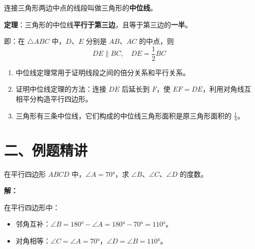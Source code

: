 \documentclass[12pt, a4paper]{ctexart}
\begin{document}
\begin{knowledgebox}[三角形中位线定理]
连接三角形两边中点的线段叫做三角形的\textbf{中位线}。

\textbf{定理}：三角形的中位线\textbf{平行于第三边}，且等于第三边的\textbf{一半}。

即：在 $\triangle ABC$ 中，$D$、$E$ 分别是 $AB$、$AC$ 的中点，则
\[
DE \parallel BC, \quad DE = \frac{1}{2}BC
\]
\end{knowledgebox}

\begin{center}
\end{center}

\begin{tipbox}[中位线定理的应用]
\begin{enumerate}[label=\arabic*.]
  \item 中位线定理常用于证明线段之间的倍分关系和平行关系。
  \item 证明中位线定理的方法：连接 $DE$ 后延长到 $F$，使 $EF = DE$，利用对角线互相平分构造平行四边形。
  \item 三角形有三条中位线，它们构成的中位线三角形面积是原三角形面积的 $\frac{1}{4}$。
\end{enumerate}
\end{tipbox}

\section*{\textcolor{examorange}{二、例题精讲}}

\begin{examplebox}
在平行四边形 $ABCD$ 中，$\angle A = 70°$，求 $\angle B$、$\angle C$、$\angle D$ 的度数。
\end{examplebox}

\textbf{解：}

在平行四边形中：
\begin{itemize}
  \item 邻角互补：$\angle B = 180° - \angle A = 180° - 70° = 110°$。
  \item 对角相等：$\angle C = \angle A = 70°$，$\angle D = \angle B = 110°$。
\end{itemize}
\end{document}
